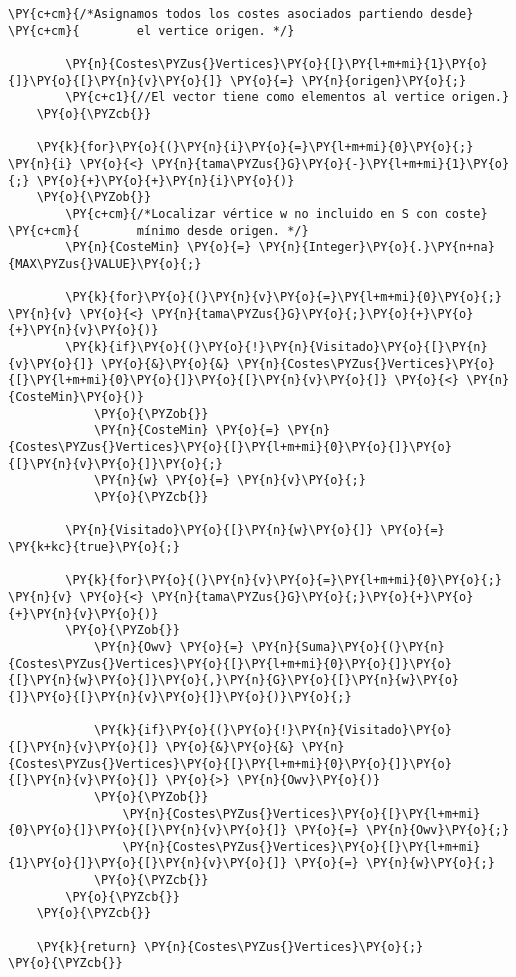 \begin{Verbatim}[commandchars=\\\{\}]
	    \PY{c+cm}{/*Asignamos todos los costes asociados partiendo desde}
\PY{c+cm}{	      el vertice origen. */}

	    \PY{n}{Costes\PYZus{}Vertices}\PY{o}{[}\PY{l+m+mi}{1}\PY{o}{]}\PY{o}{[}\PY{n}{v}\PY{o}{]} \PY{o}{=} \PY{n}{origen}\PY{o}{;}
	    \PY{c+c1}{//El vector tiene como elementos al vertice origen.}
	\PY{o}{\PYZcb{}}

    \PY{k}{for}\PY{o}{(}\PY{n}{i}\PY{o}{=}\PY{l+m+mi}{0}\PY{o}{;} \PY{n}{i} \PY{o}{<} \PY{n}{tama\PYZus{}G}\PY{o}{-}\PY{l+m+mi}{1}\PY{o}{;} \PY{o}{+}\PY{o}{+}\PY{n}{i}\PY{o}{)}
	\PY{o}{\PYZob{}}
	    \PY{c+cm}{/*Localizar vértice w no incluido en S con coste}
\PY{c+cm}{	      mínimo desde origen. */}
	    \PY{n}{CosteMin} \PY{o}{=} \PY{n}{Integer}\PY{o}{.}\PY{n+na}{MAX\PYZus{}VALUE}\PY{o}{;}

	    \PY{k}{for}\PY{o}{(}\PY{n}{v}\PY{o}{=}\PY{l+m+mi}{0}\PY{o}{;} \PY{n}{v} \PY{o}{<} \PY{n}{tama\PYZus{}G}\PY{o}{;}\PY{o}{+}\PY{o}{+}\PY{n}{v}\PY{o}{)}
		\PY{k}{if}\PY{o}{(}\PY{o}{!}\PY{n}{Visitado}\PY{o}{[}\PY{n}{v}\PY{o}{]} \PY{o}{&}\PY{o}{&} \PY{n}{Costes\PYZus{}Vertices}\PY{o}{[}\PY{l+m+mi}{0}\PY{o}{]}\PY{o}{[}\PY{n}{v}\PY{o}{]} \PY{o}{<} \PY{n}{CosteMin}\PY{o}{)}
		    \PY{o}{\PYZob{}}
			\PY{n}{CosteMin} \PY{o}{=} \PY{n}{Costes\PYZus{}Vertices}\PY{o}{[}\PY{l+m+mi}{0}\PY{o}{]}\PY{o}{[}\PY{n}{v}\PY{o}{]}\PY{o}{;}
			\PY{n}{w} \PY{o}{=} \PY{n}{v}\PY{o}{;}
		    \PY{o}{\PYZcb{}}

	    \PY{n}{Visitado}\PY{o}{[}\PY{n}{w}\PY{o}{]} \PY{o}{=} \PY{k+kc}{true}\PY{o}{;}

	    \PY{k}{for}\PY{o}{(}\PY{n}{v}\PY{o}{=}\PY{l+m+mi}{0}\PY{o}{;} \PY{n}{v} \PY{o}{<} \PY{n}{tama\PYZus{}G}\PY{o}{;}\PY{o}{+}\PY{o}{+}\PY{n}{v}\PY{o}{)}
		\PY{o}{\PYZob{}}
		    \PY{n}{Owv} \PY{o}{=} \PY{n}{Suma}\PY{o}{(}\PY{n}{Costes\PYZus{}Vertices}\PY{o}{[}\PY{l+m+mi}{0}\PY{o}{]}\PY{o}{[}\PY{n}{w}\PY{o}{]}\PY{o}{,}\PY{n}{G}\PY{o}{[}\PY{n}{w}\PY{o}{]}\PY{o}{[}\PY{n}{v}\PY{o}{]}\PY{o}{)}\PY{o}{;}

		    \PY{k}{if}\PY{o}{(}\PY{o}{!}\PY{n}{Visitado}\PY{o}{[}\PY{n}{v}\PY{o}{]} \PY{o}{&}\PY{o}{&} \PY{n}{Costes\PYZus{}Vertices}\PY{o}{[}\PY{l+m+mi}{0}\PY{o}{]}\PY{o}{[}\PY{n}{v}\PY{o}{]} \PY{o}{>} \PY{n}{Owv}\PY{o}{)}
			\PY{o}{\PYZob{}}
			    \PY{n}{Costes\PYZus{}Vertices}\PY{o}{[}\PY{l+m+mi}{0}\PY{o}{]}\PY{o}{[}\PY{n}{v}\PY{o}{]} \PY{o}{=} \PY{n}{Owv}\PY{o}{;}
			    \PY{n}{Costes\PYZus{}Vertices}\PY{o}{[}\PY{l+m+mi}{1}\PY{o}{]}\PY{o}{[}\PY{n}{v}\PY{o}{]} \PY{o}{=} \PY{n}{w}\PY{o}{;}
			\PY{o}{\PYZcb{}}
		\PY{o}{\PYZcb{}}
	\PY{o}{\PYZcb{}}

    \PY{k}{return} \PY{n}{Costes\PYZus{}Vertices}\PY{o}{;}
\PY{o}{\PYZcb{}}
\end{Verbatim}
